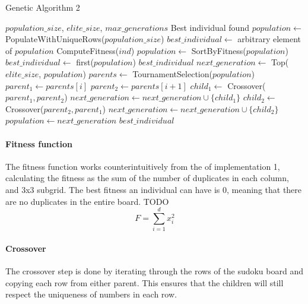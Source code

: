\begin{algorithm}[H]
\caption{Genetic Algorithm 2}\label{alg:impl-2}
\begin{algorithmic}
\Require $population\_size$, $elite\_size$, $max\_generations$
\Ensure Best individual found
\State $population \gets$ PopulateWithUniqueRows($population\_size$)
\State $best\_individual \gets$ arbitrary element of $population$
    \State ComputeFitness($ind$)
  \EndFor
  \State $population \gets$ SortByFitness($population$) 
    \State $best\_individual \gets$ first($population$)
  \EndIf
    \State \Return $best\_individual$
  \EndIf
  \State $next\_generation \gets$ Top($elite\_size$, $population$)
  \State $parents \gets$ TournamentSelection($population$)
    \State $parent_1 \gets parents[i]$
    \State $parent_2 \gets parents[i+1]$
    \State $child_1 \gets$ Crossover($parent_1, parent_2$)
    \State $next\_generation \gets next\_generation \cup \{child_1\}$
      \State $child_2 \gets$ Crossover($parent_2, parent_1$)
      \State $next\_generation \gets next\_generation \cup \{child_2\}$
    \EndIf
  \EndFor
  \State $population \gets next\_generation$
\EndFor
\State \Return $best\_individual$
\end{algorithmic}
\end{algorithm}

\paragraph{Fitness function} The fitness function works counterintuitively from the  of implementation 1, calculating the fitness as the sum of the number of duplicates in each column, and 3x3 subgrid. The best fitness an individual can have is 0, meaning that there are no duplicates in the entire board.
{
  \color{red} TODO
}
\begin{equation}
    F = \sum_{i=1}^d x_i^2 
\end{equation}

\paragraph{Crossover} The crossover step is done by iterating through the rows of the sudoku board and copying each row from either parent. This ensures that the children will still respect the uniqueness of numbers in each row.

